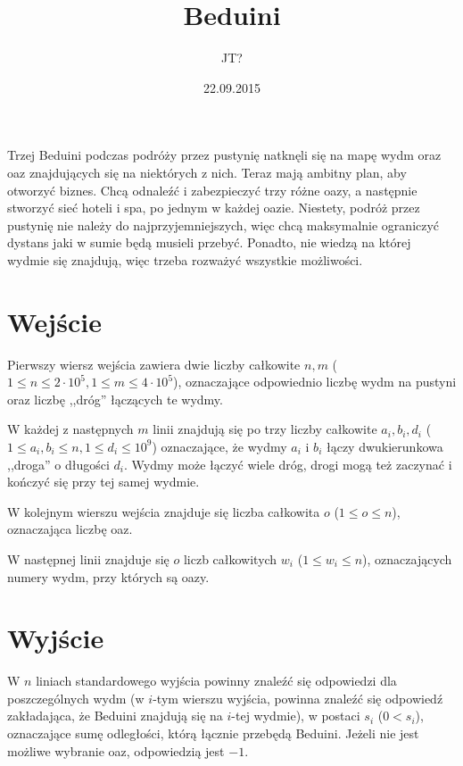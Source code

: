 \documentclass[zad,zawodnik,utf8]{sinol}
\title{Beduini}
\author{JT?}
\date{22.09.2015}
\begin{document}
  \begin{tasktext}%
Trzej Beduini podczas podróży przez pustynię natknęli się na mapę wydm oraz oaz znajdujących się na niektórych z nich. Teraz mają ambitny plan, aby otworzyć biznes. Chcą odnaleźć i zabezpieczyć trzy różne oazy, a następnie stworzyć sieć hoteli i spa, po jednym w każdej oazie. Niestety, podróż przez pustynię nie należy do najprzyjemniejszych, więc chcą maksymalnie ograniczyć dystans jaki w sumie będą musieli przebyć. Ponadto, nie wiedzą na której wydmie się znajdują, więc trzeba rozważyć wszystkie możliwości.

  \section{Wejście}
Pierwszy wiersz wejścia zawiera dwie liczby całkowite $n, m$ ($1 \leq n \leq 2 \cdot 10^5, 1 \leq m \leq 4 \cdot 10^5$), oznaczające odpowiednio liczbę wydm na pustyni oraz liczbę ,,dróg'' łączących te wydmy.

W każdej z następnych $m$ linii znajdują się po trzy liczby całkowite $a_i, b_i, d_i$ ($1 \leq a_i, b_i \leq n, 1 \leq d_i \leq 10^9$) oznaczające, że wydmy $a_i$ i $b_i$ łączy dwukierunkowa ,,droga'' o długości $d_i$. Wydmy może łączyć wiele dróg, drogi mogą też zaczynać i kończyć się przy tej samej wydmie.

W kolejnym wierszu wejścia znajduje się liczba całkowita $o$ ($1 \leq o \leq n$), oznaczająca liczbę oaz. 

W następnej linii znajduje się $o$ liczb całkowitych $w_i$ ($1 \leq w_i \leq n$), oznaczających numery wydm, przy których są oazy.

  \section{Wyjście}
W $n$ liniach standardowego wyjścia powinny znaleźć się odpowiedzi dla poszczególnych wydm (w $i$-tym wierszu wyjścia, powinna znaleźć się odpowiedź zakładająca, że Beduini znajdują się na $i$-tej wydmie), w postaci $s_i$ ($0 < s_i$), oznaczające sumę odległości, którą łącznie przebędą Beduini. Jeżeli nie jest możliwe wybranie oaz, odpowiedzią jest $-1$.

     \makecompactexample

  \end{tasktext}
\end{document}

